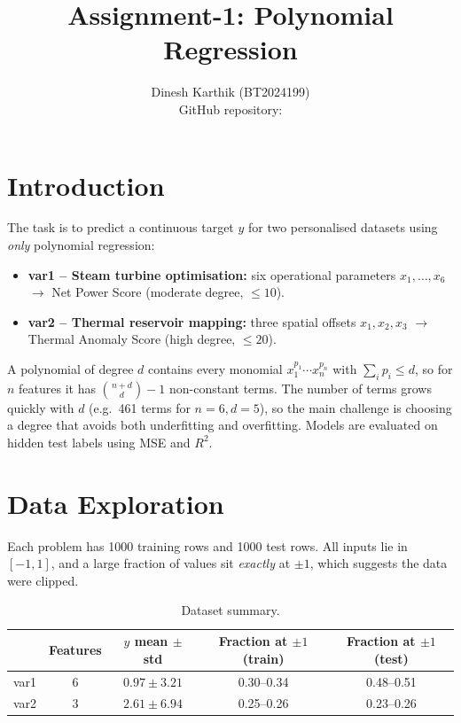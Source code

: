 \documentclass[11pt,a4paper]{article}
\title{\textbf{Assignment-1: Polynomial Regression}}
\author{Dinesh Karthik (BT2024199)\\[4pt]
\small GitHub repository: \repo}
\date{}
\begin{document}
\maketitle
\vspace{-1.5em}

\section{Introduction}
The task is to predict a continuous target $y$ for two personalised datasets using
\emph{only} polynomial regression:
\begin{itemize}
  \item \textbf{var1 -- Steam turbine optimisation:} six operational parameters
        $x_1,\dots,x_6$ $\rightarrow$ Net Power Score (moderate degree, $\le 10$).
  \item \textbf{var2 -- Thermal reservoir mapping:} three spatial offsets
        $x_1,x_2,x_3$ $\rightarrow$ Thermal Anomaly Score (high degree, $\le 20$).
\end{itemize}
A polynomial of degree $d$ contains every monomial
$x_1^{p_1}\cdots x_n^{p_n}$ with $\sum_i p_i \le d$, so for $n$ features it has
$\binom{n+d}{d}-1$ non-constant terms. The number of terms grows quickly with $d$
(e.g.\ 461 terms for $n{=}6, d{=}5$), so the main challenge is choosing a degree
that avoids both underfitting and overfitting. Models are evaluated on hidden test
labels using MSE and $R^2$.

\section{Data Exploration}
Each problem has 1000 training rows and 1000 test rows. All inputs lie in
$[-1,1]$, and a large fraction of values sit \emph{exactly} at $\pm1$, which
suggests the data were clipped.

\begin{table}[H]
\centering
\small
\begin{tabular}{lcccc}
\toprule
 & Features & $y$ mean $\pm$ std & Fraction at $\pm1$ (train) & Fraction at $\pm1$ (test) \\
\midrule
var1 & 6 & $0.97 \pm 3.21$ & 0.30--0.34 & 0.48--0.51 \\
var2 & 3 & $2.61 \pm 6.94$ & 0.25--0.26 & 0.23--0.26 \\
\bottomrule
\end{tabular}
\caption{Dataset summary.}
\label{tab:data}
\end{table}
\end{document}
